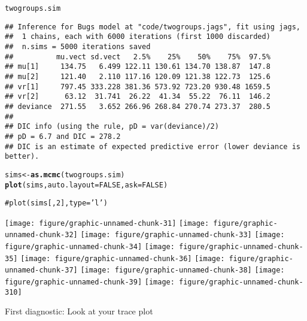 \documentclass[12pt,letterpaper,oneside]{article}\usepackage{graphicx, color}
\makeatletter
\newcommand{\hlfunctioncall}[1]{\textcolor[rgb]{0.501960784313725,0,0.329411764705882}{\textbf{#1}}}%
\newcommand{\hlcomment}[1]{\textcolor[rgb]{0.180392156862745,0.6,0.341176470588235}{#1}}%
\newenvironment{kframe}{%
 \def\at@end@of@kframe{}%
 \ifinner\ifhmode%
  \def\at@end@of@kframe{\end{minipage}}%
  \begin{minipage}{\columnwidth}%
 \fi\fi%
 \def\FrameCommand##1{\hskip\@totalleftmargin \hskip-\fboxsep
 \colorbox{shadecolor}{##1}\hskip-\fboxsep
     \hskip-\linewidth \hskip-\@totalleftmargin \hskip\columnwidth}%
 \MakeFramed {\advance\hsize-\width
   \@totalleftmargin\z@ \linewidth\hsize
   \@setminipage}}%
 {\par\unskip\endMakeFramed%
 \at@end@of@kframe}
\newenvironment{knitrout}{}{} %
\makeatother
\begin{document}
\begin{knitrout}
\begin{kframe}
\begin{alltt}
twogroups.sim
\end{alltt}
\begin{verbatim}
## Inference for Bugs model at "code/twogroups.jags", fit using jags,
##  1 chains, each with 6000 iterations (first 1000 discarded)
##  n.sims = 5000 iterations saved
##          mu.vect sd.vect   2.5%    25%    50%    75%  97.5%
## mu[1]     134.75   6.499 122.11 130.61 134.70 138.87  147.8
## mu[2]     121.40   2.110 117.16 120.09 121.38 122.73  125.6
## vr[1]     797.45 333.228 381.36 573.92 723.20 930.48 1659.5
## vr[2]      63.12  31.741  26.22  41.34  55.22  76.11  146.2
## deviance  271.55   3.652 266.96 268.84 270.74 273.37  280.5
## 
## DIC info (using the rule, pD = var(deviance)/2)
## pD = 6.7 and DIC = 278.2
## DIC is an estimate of expected predictive error (lower deviance is better).
\end{verbatim}
\begin{alltt}

sims <- \hlfunctioncall{as.mcmc}(twogroups.sim)
\hlfunctioncall{plot}(sims, auto.layout=FALSE, ask=FALSE)

\hlcomment{# plot(sims[,2], type='l')}
\end{alltt}
\end{kframe}

{\centering \texttt{[image: figure/graphic-unnamed-chunk-31]} 
\texttt{[image: figure/graphic-unnamed-chunk-32]} 
\texttt{[image: figure/graphic-unnamed-chunk-33]} 
\texttt{[image: figure/graphic-unnamed-chunk-34]} 
\texttt{[image: figure/graphic-unnamed-chunk-35]} 
\texttt{[image: figure/graphic-unnamed-chunk-36]} 
\texttt{[image: figure/graphic-unnamed-chunk-37]} 
\texttt{[image: figure/graphic-unnamed-chunk-38]} 
\texttt{[image: figure/graphic-unnamed-chunk-39]} 
\texttt{[image: figure/graphic-unnamed-chunk-310]} 

}



\end{knitrout}


First diagnostic: Look at your trace plot
\end{document}

